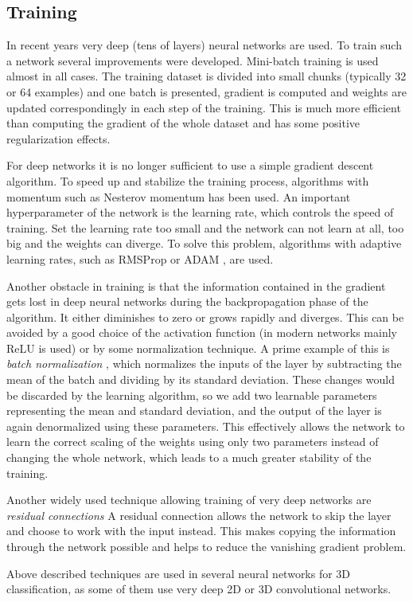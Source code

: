 \subsection{Training}
In recent years very deep (tens of layers) neural networks are used. To train such a network several improvements were developed. Mini-batch training is used almost in all cases. The training dataset is divided into small chunks (typically 32 or 64 examples) and one batch is presented, gradient is computed and weights are updated correspondingly in each step of the training. This is much more efficient than computing the gradient of the whole dataset and has some positive regularization effects. \par
For deep networks it is no longer sufficient to use a simple gradient descent algorithm. To speed up and stabilize the training process, algorithms with momentum such as Nesterov momentum \cite{sutskever_importance_2013} has been used. An important hyperparameter of the network is the learning rate, which controls the speed of training. Set the learning rate too small and the network can not learn at all, too big and the weights can diverge. To solve this problem, algorithms with adaptive learning rates, such as 
RMSProp \cite{hinton_neural_nodate} or ADAM \cite{kingma_adam:_2014}, are used. \par
Another obstacle in training is that the information contained in the gradient gets lost in deep neural networks during the backpropagation phase of the algorithm. It either diminishes to zero or grows rapidly and diverges. This can be avoided by a good choice of the activation function (in modern networks mainly ReLU is used) or by some normalization technique. A prime example of this is \textit{batch normalization} \cite{ioffe_batch_2015}, which normalizes the inputs of the layer by subtracting the mean of the batch and dividing by its standard deviation. These changes would be discarded by the learning algorithm, so we add two learnable parameters representing the mean and standard deviation, and the output of the layer is again denormalized using these parameters. This effectively allows the network to learn the correct scaling of the weights using only two parameters instead of changing the whole network, which leads to a much greater stability of the training.\par
Another widely used technique allowing training of very deep networks are \textit{residual connections} \cite{szegedy_inception-v4_2016} A residual connection allows the network to skip the layer and choose to work with the input instead. This makes copying the information through the network possible and helps to reduce the vanishing gradient problem. \par
Above described techniques are used in several neural networks for 3D classification, as some of them use very deep 2D or 3D convolutional networks.

